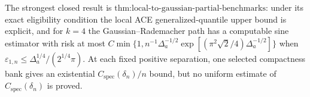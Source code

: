 The strongest closed result is \(\text{thm:local-to-gaussian-partial-benchmarks}\): under its exact eligibility condition the local ACE generalized-quantile upper bound is explicit, and for \(k=4\) the Gaussian--Rademacher path has a computable sine estimator with risk at most \(C\min\{1,n^{-1}\Delta_a^{-1/2}\exp[(\pi^2\sqrt2/4)\Delta_a^{-1/2}]\}\) when \(\varepsilon_{1,n}\le\Delta_a^{1/4}/(2^{1/4}\pi)\). At each fixed positive separation, one selected compactness bank gives an existential \(C_{\mathrm{spec}}(\delta_n)/n\) bound, but no uniform estimate of \(C_{\mathrm{spec}}(\delta_n)\) is proved.